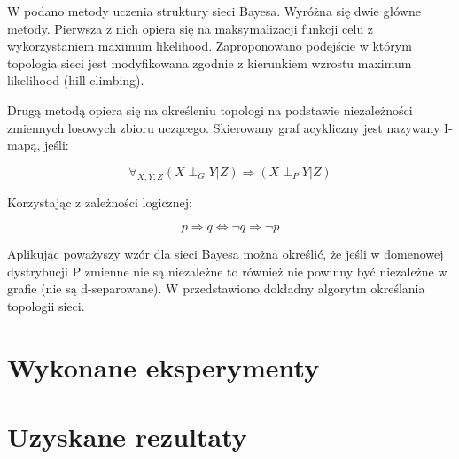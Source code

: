 \documentclass{article}
\begin{document}
W \cite{PhD} podano metody uczenia struktury sieci Bayesa. Wyróżna się dwie główne metody. Pierwsza z nich opiera się na maksymalizacji funkcji celu z wykorzystaniem maximum likelihood. Zaproponowano podejście w którym topologia sieci jest modyfikowana zgodnie z kierunkiem wzrostu maximum likelihood (hill climbing).

Drugą metodą opiera się na określeniu topologi na podstawie niezależności zmiennych losowych zbioru uczącego. Skierowany graf acykliczny jest nazywany I-mapą, jeśli:

\begin{equation}
	\forall_{X, Y, Z} (X \perp_G Y| Z) 	\Rightarrow  (X \perp_P Y | Z)
\end{equation}

Korzystając z zależności logicznej:

\begin{equation}
	p \Rightarrow q \Leftrightarrow \neg q \Rightarrow \neg p
\end{equation}

Aplikując poważyszy wzór dla sieci Bayesa można określić, że jeśli w domenowej dystrybucji P zmienne nie są niezależne to również nie powinny być niezależne w grafie (nie są d-separowane). W \cite{PhD} przedstawiono dokładny algorytm określania topologii sieci.

\section{Wykonane eksperymenty}

\section{Uzyskane rezultaty}
\end{document}
